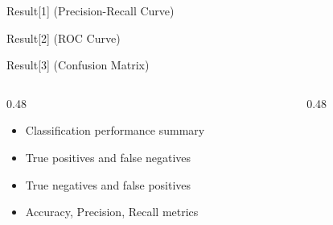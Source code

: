 
\begin{frame}{Result[1] (Precision-Recall Curve)}
    \begin{center}
        \vspace{1em}
    \end{center}
\end{frame}

\begin{frame}{Result[2] (ROC Curve)}
    \begin{center}
        \vspace{1em}
    \end{center}
\end{frame}

\begin{frame}{Result[3] (Confusion Matrix)}
    \begin{columns}[t, onlytextwidth]
        \begin{column}{0.48\textwidth}
            \begin{itemize}
                \item Classification performance summary
                \item True positives and false negatives
                \item True negatives and false positives
                \item Accuracy, Precision, Recall metrics
            \end{itemize}
        \end{column}
        \begin{column}{0.48\textwidth}
            \begin{center}
            \end{center}
        \end{column}
    \end{columns}
\end{frame}

